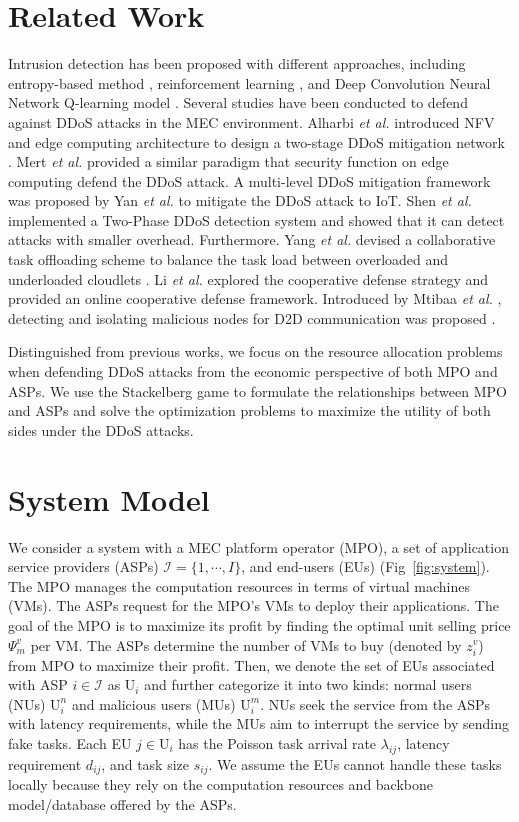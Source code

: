 \documentclass[conference]{IEEEtran}
\begin{document}
\section{Related Work}
Intrusion detection has been proposed with different approaches, including entropy-based method \cite{Wang}, reinforcement learning \cite{Zhang}, and Deep Convolution Neural Network Q-learning model \cite{Liu}. Several studies have been conducted to defend against DDoS attacks in the MEC environment.  Alharbi \emph{et al.} introduced NFV and edge computing architecture to design a two-stage DDoS mitigation network \cite{Alharbi}. Mert \emph{et al.}  provided a similar paradigm that security function on edge computing defend the DDoS attack\cite{Mert}. A multi-level DDoS mitigation framework \cite{Yan} was proposed by Yan \emph{et al.}  to mitigate the DDoS attack to IoT. Shen \emph{et al.} \cite{Shen} implemented a Two-Phase DDoS detection system and showed that it can detect attacks with smaller overhead. Furthermore. Yang \emph{et al.} devised a collaborative task offloading scheme to balance the task load between overloaded and underloaded cloudlets \cite{Yang}. Li \emph{et al.} explored the cooperative defense strategy and provided an online cooperative defense framework\cite{Li}. Introduced by Mtibaa \emph{et al.} , detecting and isolating malicious nodes for D2D communication was proposed \cite{Mtibaa}. 

Distinguished from previous works, we focus on the resource allocation problems when defending DDoS attacks from the economic perspective of both MPO and ASPs. We use the Stackelberg game to formulate the relationships between MPO and ASPs and solve the optimization problems to maximize the utility of both sides under the DDoS attacks.

\section{System Model}

We consider a system with a MEC platform operator (MPO), a set of application service providers (ASPs) $\mathcal{I}=\{1, \cdots, I\}$, and end-users (EUs) (Fig~\ref{fig:system}). The MPO manages the computation resources in terms of virtual machines (VMs). The ASPs request for the MPO's VMs to deploy their applications. The goal of the MPO is to maximize its profit by finding the optimal unit selling price $\Psi_{m}^v$ per VM.  The ASPs determine the number of VMs to buy (denoted by $z_i^v$) from MPO to maximize their profit. Then, we denote the set of EUs associated with ASP $i \in \mathcal{I}$ as $\mathrm{U}_i$ and further categorize it into two kinds: normal users (NUs) $\mathrm{U}_i^n$ and malicious users (MUs) $\mathrm{U}_i^m$. NUs seek the service from the ASPs with latency requirements, while the MUs aim to interrupt the service by sending fake tasks. Each EU $j \in \mathrm{U}_i$ has the Poisson task arrival rate $\lambda_{ij}$, latency requirement $d_{ij}$, and task size $s_{ij}$. We assume the EUs cannot handle these tasks locally because they rely on the computation resources and backbone model/database offered by the ASPs. 
\end{document}
